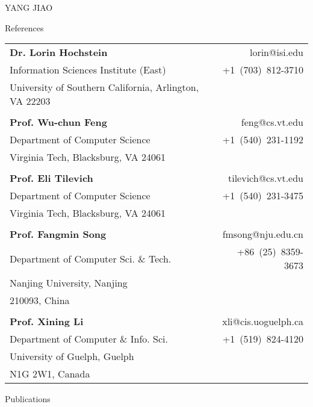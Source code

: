 \documentclass{article}
\begin{document}
\begin{cv}{YANG JIAO}
\begin{cvlist}{References}
\item 
\item
\begin{tabular}{@{}lr@{}}
\textbf{Dr. Lorin Hochstein} &lorin@isi.edu\\
Information Sciences Institute (East) &+1~(703)~812-3710\\
University of Southern California, Arlington, VA 22203\\
\\
\textbf{Prof. Wu-chun Feng} &feng@cs.vt.edu\\
Department of Computer Science & +1~(540)~231-1192\\
Virginia Tech, Blacksburg, VA 24061\\ 
\\
\textbf{Prof. Eli Tilevich} &tilevich@cs.vt.edu\\
Department of Computer Science &+1~(540)~231-3475\\
Virginia Tech, Blacksburg, VA 24061\\
\\
\textbf{Prof. Fangmin Song} &fmsong@nju.edu.cn\\
Department of Computer Sci. \& Tech. &+86~(25)~8359-3673\\
Nanjing University, Nanjing\\
210093, China\\
\\
\textbf{Prof. Xining Li} &xli@cis.uoguelph.ca\\
Department of Computer \& Info. Sci. &+1~(519)~824-4120\\
University of Guelph, Guelph\\ 
N1G 2W1, Canada\\
\end{tabular}
\end{cvlist}

\begin{cvlist}{Publications}
\item
\end{cvlist}
\nocite{*}



\end{cv}
\end{document}
